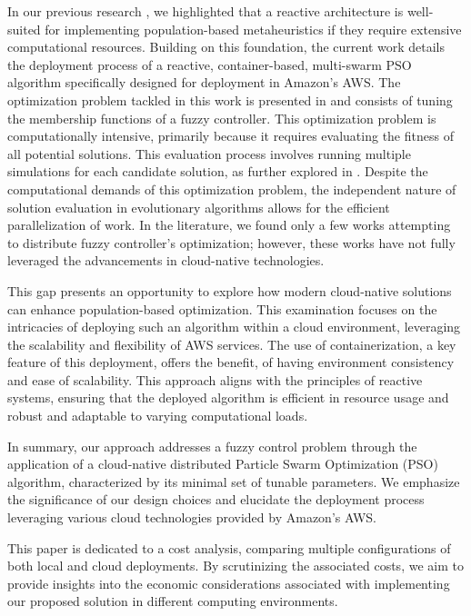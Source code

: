 \documentclass{cys}
\begin{document}
In our previous research \cite{merelo2019scaling}, we highlighted that a 
reactive architecture is well-suited for implementing population-based metaheuristics if they require 
extensive computational resources. Building on this foundation, the current work details the 
deployment process of a reactive, container-based, multi-swarm PSO algorithm specifically designed for deployment in Amazon's AWS.
The optimization problem tackled in this work is presented in \cite{mancilla2021optimization} 
and consists of tuning the membership functions of a fuzzy controller. This 
optimization problem is computationally intensive, primarily because it requires 
evaluating the fitness of all potential solutions.
This evaluation process involves running multiple simulations for each candidate 
solution, as further explored in \cite{mancilla2022tracking,mancilla2022optimal}. 
Despite the computational demands of this optimization problem, the independent 
nature of solution evaluation in evolutionary algorithms allows for the efficient parallelization of work.
In the literature, we found only a few works \cite{cortes2014optimal,oh2009design,ciurea2013determining}
attempting to distribute fuzzy controller's optimization; however, these works
have not fully leveraged the advancements in cloud-native technologies.

This gap presents an opportunity to explore how modern cloud-native solutions can 
enhance population-based optimization. This examination focuses on the intricacies of 
deploying such an algorithm within a cloud environment, leveraging the scalability and 
flexibility of AWS services. The use of containerization, a key feature of this deployment, 
offers the benefit, of having environment consistency and ease of scalability. This 
approach aligns with the principles of reactive systems, ensuring that the deployed 
algorithm is efficient in resource usage and robust and adaptable to varying computational loads.

In summary, our approach addresses a fuzzy control problem through the application
of a cloud-native distributed Particle Swarm Optimization (PSO) algorithm, characterized 
by its minimal set of tunable parameters. We emphasize the significance of our design 
choices and elucidate the deployment process leveraging various cloud technologies 
provided by Amazon's AWS.

This paper is dedicated to a cost analysis, comparing multiple 
configurations of both local and cloud deployments. By scrutinizing the associated 
costs, we aim to provide insights into the economic considerations associated with 
implementing our proposed solution in different computing environments.
\end{document}
